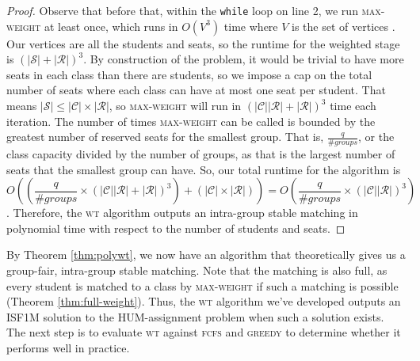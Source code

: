 \begin{proof}
  Observe that before that, within the \texttt{while} loop on line 2, we run
  \textsc{max-weight} at least once, which runs in $O(V^3)$
  time where $V$ is the set of vertices \cite{hungarian}. Our vertices are
  all the students and seats, so the runtime for the weighted stage is
  $(|\mathcal{S}| + |\mathcal{R}|)^3$. By construction of the problem, it would
  be trivial to have more seats in each class than there are students, so we
  impose a cap on
  the total number of seats where each class can have at most one seat per
  student. That means $|\mathcal{S}| \leq |\mathcal{C}| \times |\mathcal{R}|$,
  so \textsc{max-weight} will run in $(|\mathcal{C}||\mathcal{R}|+
  |\mathcal{R}|)^3$ time each iteration. The number of times \textsc{max-weight}
  can be called is bounded by the greatest number of reserved seats for the
  smallest group. That is, $\frac{q}{\# groups}$, or the class capacity
  divided by the number of groups, as that is the largest number of seats that the
  smallest group can have. So,
  our total runtime for the algorithm is \[O((\frac{q}{\# groups}\times(|\mathcal{C}||\mathcal{R}|+
  |\mathcal{R}|)^3) + (|\mathcal{C}| \times |\mathcal{R}|)) =
O(\frac{q}{\# groups}\times(|\mathcal{C}||\mathcal{R}|)^3)\]. Therefore, the
  \textsc{wt} algorithm outputs an intra-group stable matching in polynomial time with respect to
  the number of students and seats.
\end{proof}

By Theorem \ref{thm:polywt}, we now have an algorithm that theoretically gives
us a group-fair, intra-group stable matching. Note that the matching is also
full, as every student is matched to a class by \textsc{max-weight} if such a
matching is possible (Theorem \ref{thm:full-weight}). Thus, the \textsc{wt}
algorithm we've developed
outputs an ISF1M solution to the HUM-assignment problem when such a solution exists.
The next step is to evaluate \textsc{wt} against \textsc{fcfs} and \textsc{greedy} to
determine whether it performs well in practice.

